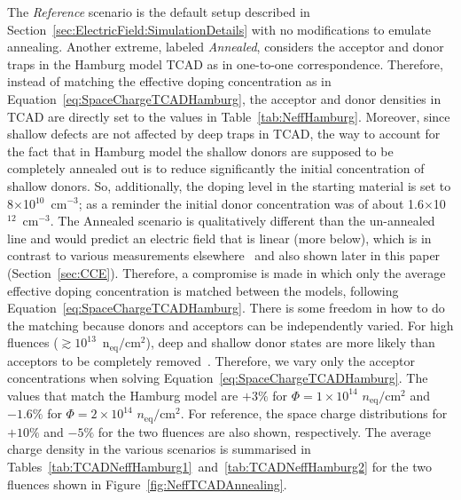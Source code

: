 The \textit{Reference} scenario is the default setup described in Section~\ref{sec:ElectricField:SimulationDetails} with no modifications to emulate annealing.  Another extreme, labeled \textit{Annealed}, considers the acceptor and donor traps in the Hamburg model TCAD as in one-to-one correspondence.  Therefore, instead of matching the effective doping concentration as in Equation~\ref{eq:SpaceChargeTCADHamburg}, the acceptor and donor densities in TCAD are directly set to the values in Table~\ref{tab:NeffHamburg}.  Moreover, since shallow defects are not affected by deep traps in TCAD, the way to account for the fact that in Hamburg model the shallow donors are supposed to be completely annealed out is to reduce significantly the initial concentration of shallow donors. So, additionally, the doping level in the starting material is set to 8$\times$10$^{10}$~cm$^{-3}$;  as a reminder the initial donor concentration was of about 1.6$\times$10$^{12}$~cm$^{-3}$.   The Annealed scenario is qualitatively different than the un-annealed line and would predict an electric field that is linear (more below), which is in contrast to various measurements elsewhere~\cite{CHIOCHIA2006} and also shown later in this paper (Section~\ref{sec:CCE}).  Therefore, a compromise is made in which only the average effective doping concentration is matched between the models, following Equation~\ref{eq:SpaceChargeTCADHamburg}.  There is some freedom in how to do the matching because donors and acceptors can be independently varied.  For high fluences 
($\gtrsim10^{13}$~n$_\text{eq}/\text{cm}^{2}$), deep and shallow donor states are more likely than acceptors to be completely removed~\cite{moll-thesis}.  Therefore, we vary only the acceptor concentrations when solving Equation~\ref{eq:SpaceChargeTCADHamburg}.   The values that match the Hamburg model are $+3\%$ for $\Phi=1\times10^{14}$ $n_\text{eq}/\text{cm}^2$ and $-1.6\%$ for $\Phi=2\times10^{14}$ $n_\text{eq}/\text{cm}^2$.  For reference, the space charge distributions for $+10\%$ and $-5\%$ for the two fluences are also shown, respectively.   The average charge density in the various scenarios is summarised in Tables~\ref{tab:TCADNeffHamburg1}~and~\ref{tab:TCADNeffHamburg2} for the two fluences shown in Figure~\ref{fig:NeffTCADAnnealing}.




